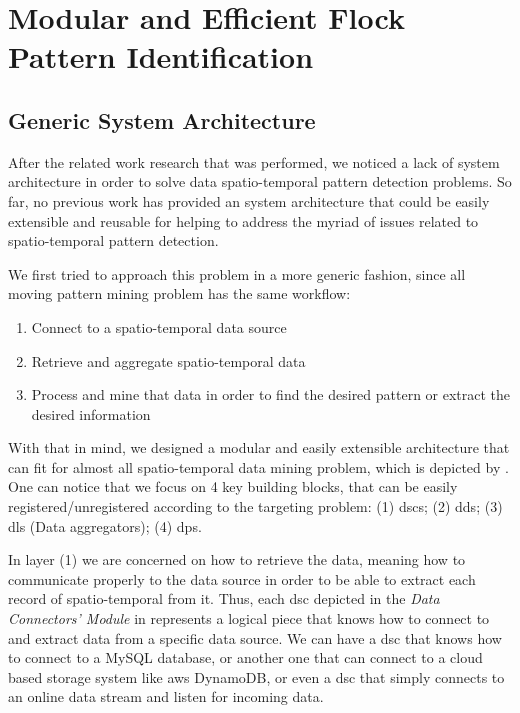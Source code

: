 \chapter{Modular and Efficient Flock Pattern Identification}
\label{chp:solution}
\section{Generic System Architecture}
\label{sec:architecture}
After the related work research that was performed, we noticed a lack of system architecture in order to solve data
spatio-temporal pattern detection problems. So far, no previous work has provided an system architecture that could be
easily extensible and reusable for helping to address the myriad of issues related to spatio-temporal pattern detection.

We first tried to approach this problem in a more generic fashion, since all moving pattern mining problem has the same
workflow:

\begin{enumerate}
    \item Connect to a spatio-temporal data source
    \item Retrieve and aggregate spatio-temporal data
    \item Process and mine that data in order to find the desired pattern or extract the desired information
\end{enumerate}

With that in mind, we designed a modular and easily extensible architecture that can fit for almost all spatio-temporal
data mining problem, which is depicted by . One can notice that we focus on 4 key building
blocks, that can be easily registered/unregistered according to the targeting problem: (1) \acp{dsc}; (2) \acp{dd}; (3)
\acp{dl} (Data aggregators); (4) \acp{dp}.

In layer (1) we are concerned on how to retrieve the data, meaning how to communicate properly to the data source in
order to be able to extract each record of spatio-temporal from it. Thus, each \ac{dsc} depicted in the \textit{Data
Connectors' Module} in  represents a logical piece that knows how to connect to and extract
data from a specific data source. We can have a \ac{dsc} that knows how to connect to a MySQL database, or another one
that can connect to a cloud based storage system like \ac{aws} DynamoDB, or even a \ac{dsc} that simply connects to an
online data stream and listen for incoming data.


